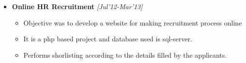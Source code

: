 \\[-0.8cm]\\
\begin{itemize}
	\item \textbf{Online HR Recruitment} \hfill \emph{[Jul'12-Mar'13]} \\[-0.4cm]
	\begin{itemize}
	      \item Objective was to develop a website for making recruitment process online\\[-0.4cm]
	      \item It is a php based project and database used is sql-server.\\[-0.4cm]
	      \item Performs shorlisting according to the details filled by the applicants.\\[-0.4cm]
	\end{itemize}
\end{itemize}
